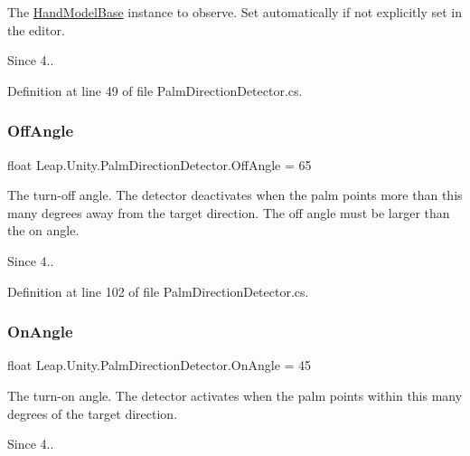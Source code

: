 The \mbox{\hyperlink{class_leap_1_1_unity_1_1_hand_model_base}{Hand\+Model\+Base}} instance to observe. Set automatically if not explicitly set in the editor. \begin{DoxySince}{Since}
4.. 
\end{DoxySince}


Definition at line 49 of file Palm\+Direction\+Detector.\+cs.

\mbox{\label{class_leap_1_1_unity_1_1_palm_direction_detector_ab04effce60950f3e1cc50d13507871b3}} 
\subsubsection{\texorpdfstring{OffAngle}{OffAngle}}
{\footnotesize\ttfamily float Leap.\+Unity.\+Palm\+Direction\+Detector.\+Off\+Angle = 65}

The turn-\/off angle. The detector deactivates when the palm points more than this many degrees away from the target direction. The off angle must be larger than the on angle. \begin{DoxySince}{Since}
4.. 
\end{DoxySince}


Definition at line 102 of file Palm\+Direction\+Detector.\+cs.

\mbox{\label{class_leap_1_1_unity_1_1_palm_direction_detector_aecf3d9f415408c7ea4fe2f2df0b39d6a}} 
\subsubsection{\texorpdfstring{OnAngle}{OnAngle}}
{\footnotesize\ttfamily float Leap.\+Unity.\+Palm\+Direction\+Detector.\+On\+Angle = 45}

The turn-\/on angle. The detector activates when the palm points within this many degrees of the target direction. \begin{DoxySince}{Since}
4.. 
\end{DoxySince}


